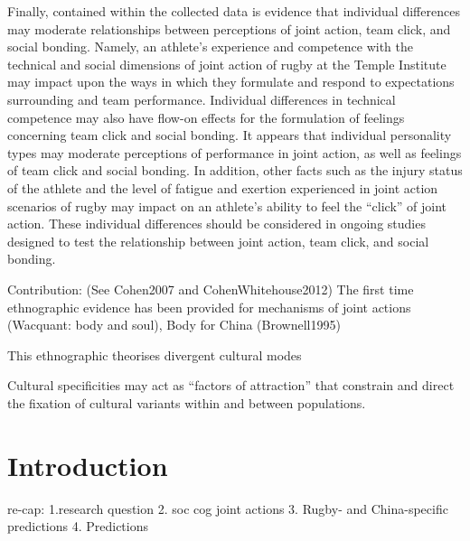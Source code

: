 Finally, contained within the collected data is evidence that individual differences may moderate relationships between perceptions of joint action, team click, and social bonding.  Namely, an athlete's experience and competence with the technical and social dimensions of joint action of rugby at the Temple Institute may impact upon the ways in which they formulate and respond to expectations surrounding and team performance.  Individual differences in technical competence may also have flow-on effects for the formulation of feelings concerning team click and social bonding. It appears that individual personality types may moderate perceptions of performance in joint action, as well as feelings of team click and social bonding. In addition, other facts such as the injury status of the athlete and the level of fatigue and exertion experienced in joint action scenarios of rugby may impact on an athlete's ability to feel the ``click'' of joint action.  These individual differences should be considered in ongoing studies designed to test the relationship between joint action, team click, and social bonding.


Contribution: (See Cohen2007 and CohenWhitehouse2012)
The first time ethnographic evidence has been provided for mechanisms of joint actions
(Wacquant: body and soul), Body for China (Brownell1995)

This ethnographic theorises divergent cultural modes


Cultural specificities may act as ``factors of attraction'' \citep{Sperber2014} that constrain and direct the fixation of cultural variants within and between populations.





\section{Introduction}

re-cap:
1.research question
2. soc cog joint actions
3. Rugby-  and China-specific predictions
4. Predictions









